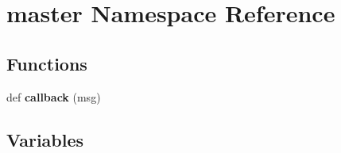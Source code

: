 \hypertarget{namespacemaster}{}\section{master Namespace Reference}
\label{namespacemaster}
\subsection*{Functions}
\begin{DoxyCompactItemize}
\item 
\mbox{\label{namespacemaster_a7a8ae7cd762cf89f7907b1e9951f5abb}} 
def {\bfseries callback} (msg)
\end{DoxyCompactItemize}
\subsection*{Variables}
